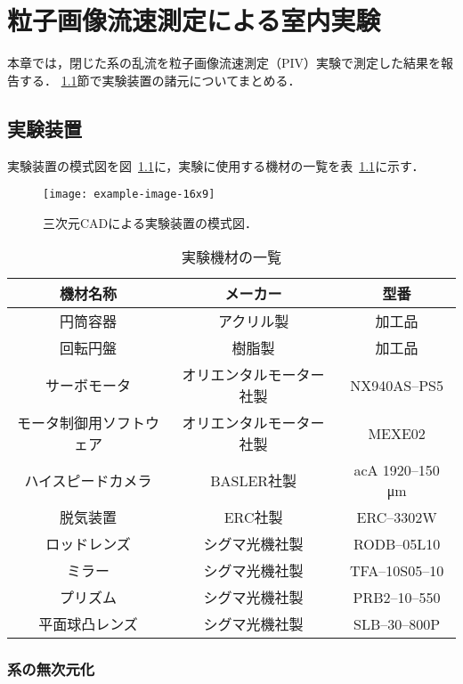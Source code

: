 \chapter{粒子画像流速測定による室内実験}
\label{chap:Experiment}

本章では，閉じた系の乱流を粒子画像流速測定（PIV）実験で測定した結果を報告する．
\ref{sec:ExperimentalSetup}節で実験装置の諸元についてまとめる．


\section{実験装置}
\label{sec:ExperimentalSetup}

実験装置の模式図を図~\ref{fig:experiment_schematic}に，実験に使用する機材の一覧を表~\ref{table:ListofEquipment}に示す．
\begin{figure}[!t]
  \centering
  \texttt{[image: example-image-16x9]}
  \caption{
    三次元CADによる実験装置の模式図．
  }
  \label{fig:experiment_schematic}
\end{figure}

\begin{table}[!t]
  \centering
  \caption{実験機材の一覧}
  \begin{tabular}{c|cc}
    機材名称 & メーカー & 型番 \\ \hline \hline
    円筒容器 & アクリル製 & 加工品 \\
    回転円盤 & 樹脂製 & 加工品 \\
    サーボモータ & オリエンタルモーター社製 & NX940AS--PS5 \\
    モータ制御用ソフトウェア & オリエンタルモーター社製 & MEXE02 \\
    ハイスピードカメラ & BASLER社製 & acA 1920--150 \si{\micro \meter} \\
    脱気装置 & ERC社製 & ERC--3302W \\
    ロッドレンズ & シグマ光機社製 & RODB--05L10 \\
    ミラー & シグマ光機社製 & TFA--10S05--10 \\
    プリズム & シグマ光機社製 & PRB2--10--550 \\
    平面球凸レンズ & シグマ光機社製 & SLB--30--800P
  \end{tabular}
  \label{table:ListofEquipment}
\end{table}


\subsection{系の無次元化}
\label{subsec:ES_UndimentionalizedSystem}

